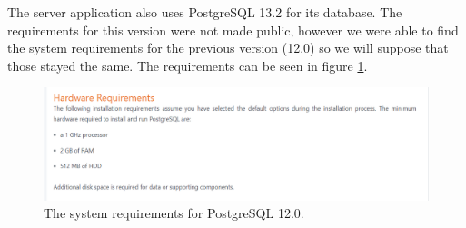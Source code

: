 The server application also uses PostgreSQL 13.2 for its database. The requirements for this version were not made public, however we were able to find the system requirements for the previous version (12.0) so we will suppose that those stayed the same. The requirements can be seen in figure \ref{fig:requirements-postgresql}.

\begin{figure}
\centering
\includegraphics[width=\textwidth]{figures/postgresql_requirements.png}
\caption{The system requirements for PostgreSQL 12.0. \cite{postgresSql}}
\label{fig:requirements-postgresql}
\end{figure}